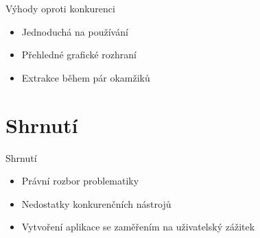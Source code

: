 \documentclass[czech,aspectratio=169]{beamer}
\begin{document}
	\begin{frame}
		\begin{center}
		\end{center}
	\end{frame}

	\begin{frame}{Výhody oproti konkurenci}
		\begin{itemize}
			\item Jednoduchá na používání
			\item Přehledné grafické rozhraní
			\item Extrakce během pár okamžiků 
		\end{itemize}
	\end{frame}

	
	\section{Shrnutí}
	 \begin{frame}{Shrnutí}
	 	\begin{itemize}
	 		\item Právní rozbor problematiky
	 		\item Nedostatky konkurenčních nástrojů
	 		\item Vytvoření aplikace se zaměřením na uživatelský zážitek
	 	\end{itemize}
	 \end{frame}
\end{document}

